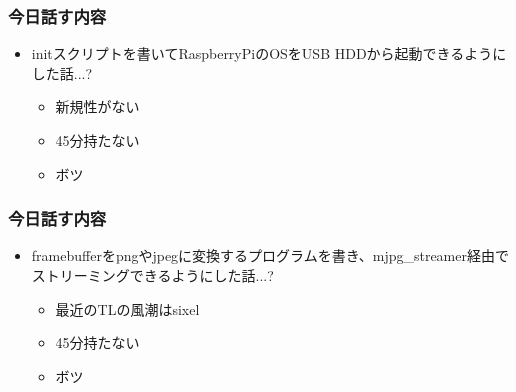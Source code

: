 \documentclass[dvipdfmx,20pt,notheorems,t]{beamer}
\begin{document}
\begin{frame}\frametitle{今日話す内容}
\begin{itemize}
	\item initスクリプトを書いてRaspberryPiのOSをUSB HDDから起動できるようにした話...?
	\begin{itemize}
		\item 新規性がない
		\item 45分持たない
		\item ボツ
	\end{itemize}
\end{itemize}
\end{frame}
\begin{frame}\frametitle{今日話す内容}
\begin{itemize}
	\item framebufferをpngやjpegに変換するプログラムを書き、mjpg\_streamer経由でストリーミングできるようにした話...?
	\begin{itemize}
		\item 最近のTLの風潮はsixel
		\item 45分持たない
		\item ボツ
	\end{itemize}
\end{itemize}
\end{frame}
\end{document}
